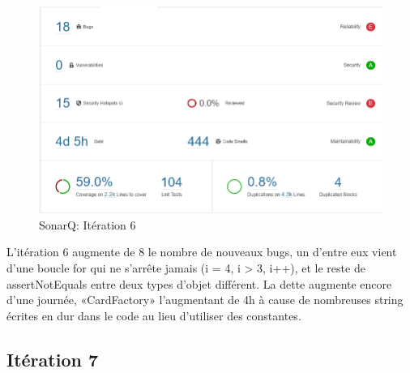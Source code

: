 \documentclass[13pt ,a4paper ]{report}
\begin{document}
\begin{multicols}{2}
      	\paragraph{}
        \begin{figure}[H]
      	\begin{center}
			\includegraphics[scale=0.3]{6.png}
			\caption{SonarQ: Itération 6}
		\end{center}
		\end{figure}
L’itération 6 augmente de 8 le nombre de nouveaux bugs, un d’entre eux vient d’une boucle for qui ne s’arrête jamais (i = 4, i > 3, i++), et le reste de assertNotEquals entre deux types d’objet différent. La dette augmente encore d’une journée, «CardFactory» l’augmentant de 4h à cause de nombreuses string écrites en dur dans le code au lieu d’utiliser des constantes.

  		\subsection{Itération 7}

\end{multicols}
\end{document}
